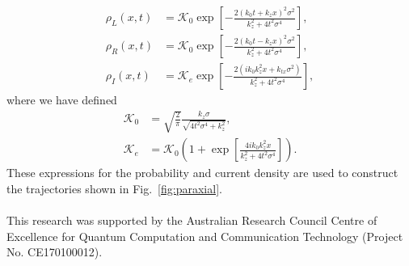 \documentclass[12pt,prx,
,nofootinbib
,floatfix
,superscriptaddress
]{revtex4-2}
\begin{document}
\begin{align}
    \rho_L(x,t) &= \mathcal{K}_0 \exp \left[ -\frac{2(k_0t + k_zx)^2 \sigma^2}{k_z^2 + 4t^2\sigma^4} \right] , \nonumber  \\
    \rho_R (x,t) &= \mathcal{K}_0  \exp \left[ - \frac{2(k_0t - k_zx)^2\sigma^2}{k_z^2 + 4t^2\sigma^4} \right], \nonumber \\
    \rho_I (x,t) &= \mathcal{K}_e  \exp \left[ - \frac{2(ik_0k_z^2 x + k_{tx}\sigma^2)}{k_z^2 + 4t^2 \sigma^4} \right] ,
\end{align}
where we have defined 
\begin{align}
    \mathcal{K}_0 &= \sqrt{\frac{2}{\pi}} \frac{k_z\sigma}{\sqrt{4t^2\sigma^4 + k_z^2}}  , \nonumber \\
    \mathcal{K}_e &= \mathcal{K}_0 \left( 1 + \exp \left[ \frac{4ik_0 k_z^2x}{k_z^2 + 4t^2\sigma^4} \right] \right) .
\end{align}
These expressions for the probability and current density are used to construct the trajectories shown in Fig.\ \ref{fig:paraxial}. 
\\\\

\acknowledgements
This research was supported by the Australian Research Council Centre of Excellence for Quantum Computation and Communication Technology (Project
No. CE170100012).

 
\end{document}
